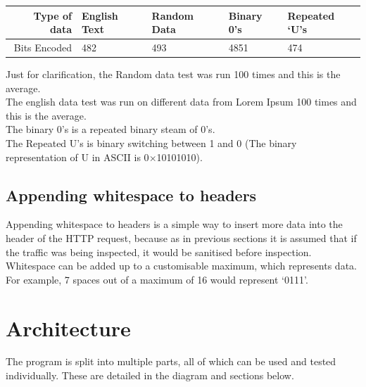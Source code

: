 \documentclass[12pt]{article}
\begin{document}
\begin{table}[ht]
\begin{tabular}{@{}rllll@{}}
\toprule
Type of data & English Text & Random Data & Binary 0's & Repeated `U's \\ \midrule
Bits Encoded & 482 & 493 & 4851 & 474 \\ \bottomrule
\end{tabular}
\end{table}
{\small * Just for clarification, the Random data test was run 100 times and this is the average.\\ The english data test was run on different data from Lorem Ipsum 100 times and this is the average. \\ The binary 0's is a repeated binary steam of 0's.\\ The Repeated U's is binary switching between 1 and 0 (The binary representation of U in ASCII is 0$\times$10101010).}

\subsection{Appending whitespace to headers}
Appending whitespace to headers is a simple way to insert more data into the header of the HTTP request, because as in previous sections it is assumed that if the traffic was being inspected, it would be sanitised before inspection. \\
Whitespace can be added up to a customisable maximum, which represents data.
For example, 7 spaces out of a maximum of 16 would represent `0111'.

\newpage

\section{Architecture}
The program is split into multiple parts, all of which can be used and tested individually.
These are detailed in the diagram and sections below.

\begin{center}
\end{center}
\end{document}
